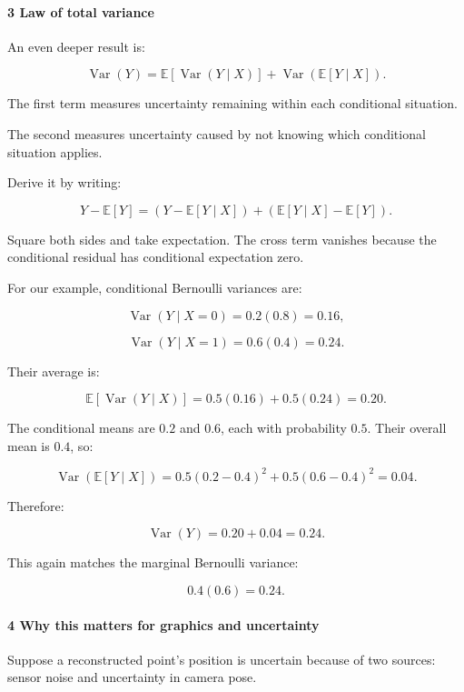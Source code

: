 \paragraph{3 Law of total variance}\label{law-of-total-variance}

An even deeper result is:

\[
 \boxed{ \operatorname{Var}(Y) = \mathbb E[\operatorname{Var}(Y\mid X)] + \operatorname{Var}(\mathbb E[Y\mid X]) }.
\]

The first term measures uncertainty remaining within each conditional situation.

The second measures uncertainty caused by not knowing which conditional situation applies.

Derive it by writing:

\[
 Y-\mathbb E[Y] = (Y-\mathbb E[Y\mid X]) + (\mathbb E[Y\mid X]-\mathbb E[Y]).
\]

Square both sides and take expectation. The cross term vanishes because the conditional residual has conditional expectation zero.

For our example, conditional Bernoulli variances are:

\[
 \operatorname{Var}(Y\mid X=0)=0.2(0.8)=0.16,
\]

\[
 \operatorname{Var}(Y\mid X=1)=0.6(0.4)=0.24.
\]

Their average is:

\[
 \mathbb E[\operatorname{Var}(Y\mid X)] = 0.5(0.16)+0.5(0.24) =\boxed{0.20}.
\]

The conditional means are \(0.2\) and \(0.6\), each with probability \(0.5\). Their overall mean is \(0.4\), so:

\[
 \operatorname{Var}(\mathbb E[Y\mid X]) = 0.5(0.2-0.4)^2+ 0.5(0.6-0.4)^2 =\boxed{0.04}.
\]

Therefore:

\[
 \operatorname{Var}(Y)=0.20+0.04=\boxed{0.24}.
\]

This again matches the marginal Bernoulli variance:

\[
 0.4(0.6)=0.24.
\]

\paragraph{4 Why this matters for graphics and uncertainty}\label{why-this-matters-for-graphics-and-uncertainty}

Suppose a reconstructed point's position is uncertain because of two sources: sensor noise and uncertainty in camera pose.

